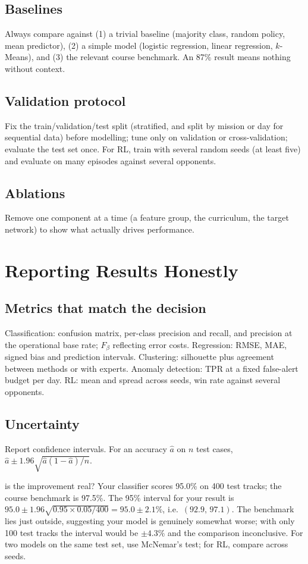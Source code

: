 \documentclass[11pt]{article}
\begin{document}
\subsection{Baselines}
Always compare against (1) a trivial baseline (majority class, random policy, mean predictor), (2) a simple model (logistic regression, linear regression, $k$-Means), and (3) the relevant course benchmark. An 87\% result means nothing without context.
\subsection{Validation protocol}
Fix the train/validation/test split (stratified, and split by mission or day for sequential data) before modelling; tune only on validation or cross-validation; evaluate the test set once. For RL, train with several random seeds (at least five) and evaluate on many episodes against several opponents.
\subsection{Ablations}
Remove one component at a time (a feature group, the curriculum, the target network) to show what actually drives performance.

\section{Reporting Results Honestly}
\subsection{Metrics that match the decision}
Classification: confusion matrix, per-class precision and recall, and precision at the operational base rate; $F_\beta$ reflecting error costs. Regression: RMSE, MAE, signed bias and prediction intervals. Clustering: silhouette plus agreement between methods or with experts. Anomaly detection: TPR at a fixed false-alert budget per day. RL: mean and spread across seeds, win rate against several opponents.
\subsection{Uncertainty}
Report confidence intervals. For an accuracy $\hat a$ on $n$ test cases, $\hat a\pm1.96\sqrt{\hat a(1-\hat a)/n}$.
\begin{example}{is the improvement real?}
Your classifier scores 95.0\% on 400 test tracks; the course benchmark is 97.5\%. The 95\% interval for your result is $95.0\pm1.96\sqrt{0.95\times0.05/400}=95.0\pm2.1\%$, i.e.\ $(92.9,\,97.1)$. The benchmark lies just outside, suggesting your model is genuinely somewhat worse; with only 100 test tracks the interval would be $\pm4.3\%$ and the comparison inconclusive. For two models on the same test set, use McNemar's test; for RL, compare across seeds.
\end{example}
\end{document}
